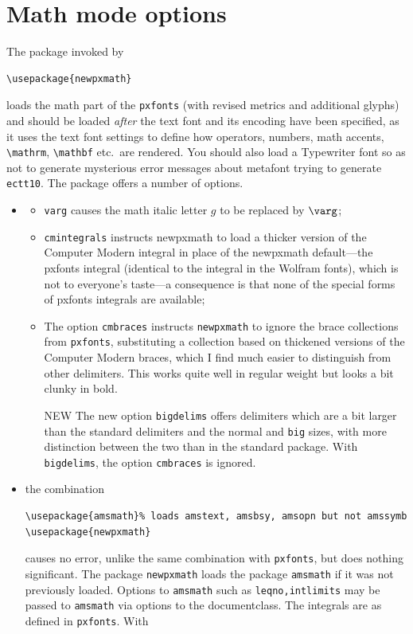 \documentclass[11pt]{article}
\theoremstyle{oldplain}
\theoremstyle{plain}
\begin{document}
\section{Math mode options}
The package invoked by
\begin{verbatim}
\usepackage{newpxmath}
\end{verbatim}
loads the math part of the {\tt pxfonts} (with revised metrics and additional glyphs) and should be loaded \emph{after} the text font and its encoding have been specified, as it uses the text font settings to define how operators, numbers, math accents, \verb|\mathrm|, \verb|\mathbf| etc.\ are rendered. You should also load a Typewriter font so as not to generate mysterious error messages about \textsf{metafont} trying to generate \texttt{ectt10}. The package offers a number of options.
\begin{itemize}
\item 
\begin{itemize}
\item{\tt varg} causes the math italic letter $g$ to be replaced by $\varg$;
\item{\tt cmintegrals} instructs \textsf{newpxmath} to load a thicker version of the Computer Modern integral in place of the \textsf{newpxmath} default---the pxfonts integral (identical to the integral in the Wolfram fonts), which is not to everyone's taste---a consequence is that none of the special forms of \textsf{pxfonts} integrals are available;
\item The option {\tt cmbraces} instructs {\tt newpxmath} to ignore the brace collections from {\tt pxfonts}, substituting a collection based on thickened versions of the Computer Modern braces, which I find much easier to distinguish from other delimiters. This works quite well in regular weight but looks a bit clunky in bold.
\item [NEW] The new option {\tt bigdelims} offers delimiters which are a bit larger than the standard delimiters and the normal and {\tt big} sizes, with more distinction between the two than in the standard package. With {\tt bigdelims}, the option {\tt cmbraces} is ignored.
\end{itemize}
\item the combination
\begin{verbatim}
\usepackage{amsmath}% loads amstext, amsbsy, amsopn but not amssymb
\usepackage{newpxmath}
\end{verbatim}
causes no error, unlike the same combination with {\tt pxfonts}, but does nothing significant. The package {\tt newpxmath} loads the package {\tt amsmath} if it was not previously loaded. Options to {\tt amsmath} such as {\tt leqno,intlimits} may be passed to {\tt amsmath} via options to the documentclass. The integrals are as defined in {\tt pxfonts}. With

\end{itemize}
\end{document}
